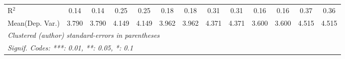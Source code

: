 \begin{tabular}{lcccccccccccc}
   R$^2$                                    & 0.14          & 0.14           & 0.25         & 0.25           & 0.18          & 0.18           & 0.31    & 0.31          & 0.16          & 0.16           & 0.37         & 0.36\\  
Mean(Dep. Var.) & 3.790 & 3.790 & 4.149 & 4.149 & 3.962 & 3.962 & 4.371 & 4.371 & 3.600 & 3.600 & 4.515 & 4.515 \\
   \midrule \midrule
   \multicolumn{13}{l}{\emph{Clustered (author) standard-errors in parentheses}}\\
   \multicolumn{13}{l}{\emph{Signif. Codes: ***: 0.01, **: 0.05, *: 0.1}}\\
\end{tabular}
\par\endgroup
